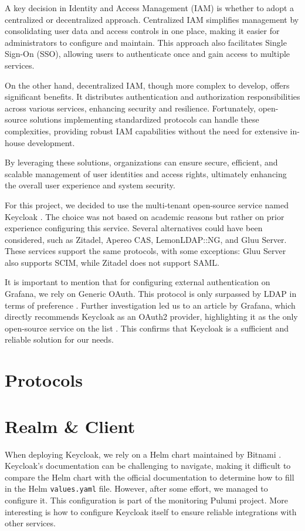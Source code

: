 A key decision in Identity and Access Management (IAM) is whether to adopt a centralized or decentralized approach. Centralized IAM simplifies management by consolidating user data and access controls in one place, making it easier for administrators to configure and maintain. This approach also facilitates Single Sign-On (SSO), allowing users to authenticate once and gain access to multiple services.

On the other hand, decentralized IAM, though more complex to develop, offers significant benefits. It distributes authentication and authorization responsibilities across various services, enhancing security and resilience. Fortunately, open-source solutions implementing standardized protocols can handle these complexities, providing robust IAM capabilities without the need for extensive in-house development.

By leveraging these solutions, organizations can ensure secure, efficient, and scalable management of user identities and access rights, ultimately enhancing the overall user experience and system security.

For this project, we decided to use the multi-tenant open-source service named Keycloak \parencite{keycloak}. The choice was not based on academic reasons but rather on prior experience configuring this service. Several alternatives could have been considered, such as Zitadel, Apereo CAS, LemonLDAP::NG, and Gluu Server. These services support the same protocols, with some exceptions: Gluu Server also supports SCIM, while Zitadel does not support SAML. 

It is important to mention that for configuring external authentication on Grafana, we rely on Generic OAuth. This protocol is only surpassed by LDAP in terms of preference \parencite{grafana_authentication}. Further investigation led us to an article by Grafana, which directly recommends Keycloak as an OAuth2 provider, highlighting it as the only open-source service on the list \parencite{grafana_oauth}. This confirms that Keycloak is a sufficient and reliable solution for our needs.

\section{Protocols}

\section{Realm \& Client}
When deploying Keycloak, we rely on a Helm chart maintained by Bitnami \parencite{bitnami_keycloak}. Keycloak's documentation can be challenging to navigate, making it difficult to compare the Helm chart with the official documentation to determine how to fill in the Helm \texttt{values.yaml} file. However, after some effort, we managed to configure it. This configuration is part of the monitoring Pulumi project. More interesting is how to configure Keycloak itself to ensure reliable integrations with other services.

